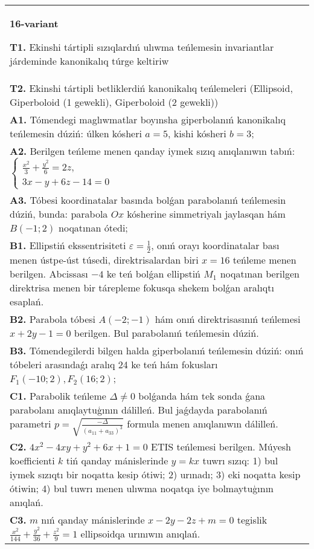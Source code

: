 \documentclass{article}
\begin{document}
\begin{tabular}{m{17cm}}
\textbf{16-variant}
\newline

\textbf{T1.} Ekinshi tártipli sızıqlardıń ulıwma teńlemesin invariantlar járdeminde kanonikalıq túrge keltiriw \\
\textbf{T2.} Ekinshi tártipli betliklerdiń kanonikalıq teńlemeleri (Ellipsoid, Giperboloid (1 gewekli), Giperboloid (2 gewekli)) \\
\textbf{A1.} Tómendegi maglıwmatlar boyınsha giperbolanıń kanonikalıq teńlemesin dúziń: úlken kósheri $a=5$, kishi kósheri $b=3$; \\
\textbf{A2.} Berilgen teńleme menen qanday iymek sızıq anıqlanıwın tabıń: $\left\{\begin{array}{l}\frac{x^2}{3}+\frac{y^2}{6}=2 z, \\ 3 x-y+6 z-14=0\end{array}\right.$ \\
\textbf{A3.} Tóbesi koordinatalar basında bolǵan parabolanıń teńlemesin dúziń, bunda: parabola $Ox$ kósherine simmetriyalı jaylasqan hám $B (-1; 2) $ noqatınan ótedi; \\
\textbf{B1.} Ellipstiń ekssentrisiteti $\varepsilon=\frac{1}{2}$, onıń orayı koordinatalar bası menen ústpe-úst túsedi, direktrisalardan biri $x=16$ teńleme menen berilgen. Abcissası $-4$ ke teń bolǵan ellipstiń $M_1$ noqatınan berilgen direktrisa menen bir tárepleme fokusqa shekem bolǵan aralıqtı esaplań. \\
\textbf{B2.} Parabola tóbesi $A (-2;-1) $ hám onıń direktrisasınıń teńlemesi $x+2y-1=0$ berilgen. Bul parabolanıń teńlemesin dúziń. \\
\textbf{B3.} Tómendegilerdi bilgen halda giperbolanıń teńlemesin dúziń: onıń tóbeleri arasındaǵı aralıq 24 ke teń hám fokusları $F_1 (-10; 2), F_2 (16; 2) $; \\
\textbf{C1.} Parabolik teńleme $\Delta \neq 0$ bolǵanda hám tek sonda ǵana parabolanı anıqlaytuģının dálilleń. Bul jaǵdayda parabolanıń parametri $p=\sqrt{\frac{-\Delta}{ (a_{11}+a_{33}) ^3}}$ formula menen anıqlanıwın dálilleń. \\
\textbf{C2.} $4 x^2-4 x y+y^2+6 x+1=0$ ETIS teńlemesi berilgen. Múyesh koefficienti $k$ tiń qanday mánislerinde $y=kx$ tuwrı sızıq: 1) bul iymek sızıqtı bir noqatta kesip ótiwi; 2) urınadı; 3) eki noqatta kesip ótiwin; 4) bul tuwrı menen ulıwma noqatqa iye bolmaytuģının anıqlań. \\
\textbf{C3.} $m$ nıń qanday mánislerinde $x-2 y-2 z+m=0$ tegislik $\frac{x^2}{144}+\frac{y^2}{36}+\frac{z^2}{9}=1$ ellipsoidqa urınıwın anıqlań. \\

\end{tabular}
\vspace{1cm}
\end{document}
